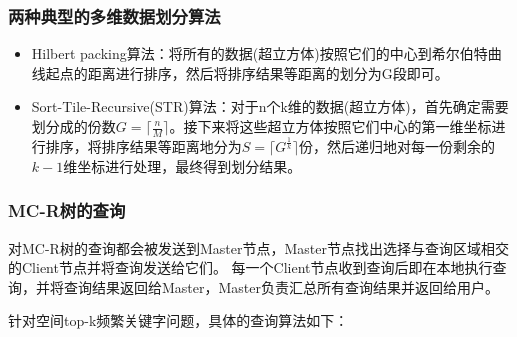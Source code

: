 \documentclass{elegantpaper}
\begin{document}
\subsubsection{两种典型的多维数据划分算法}

\begin{itemize}
    
    \item Hilbert packing算法：将所有的数据(超立方体)按照它们的中心到希尔伯特曲线起点的距离进行排序，然后将排序结果等距离的划分为G段即可。

    \item Sort-Tile-Recursive(STR)算法：对于n个k维的数据(超立方体)，首先确定需要划分成的份数$G = \lceil \frac{n}{M} \rceil$。接下来将这些超立方体按照它们中心的第一维坐标进行排序，将排序结果等距离地分为$S = \lceil G^{\frac{1}{k}} \rceil$份，然后递归地对每一份剩余的$k - 1$维坐标进行处理，最终得到划分结果。

\end{itemize}

\subsubsection{MC-R树的查询}

对MC-R树的查询都会被发送到Master节点，Master节点找出选择与查询区域相交的Client节点并将查询发送给它们。
每一个Client节点收到查询后即在本地执行查询，并将查询结果返回给Master，Master负责汇总所有查询结果并返回给用户。

\noindent 针对空间top-k频繁关键字问题，具体的查询算法如下：
\end{document}
